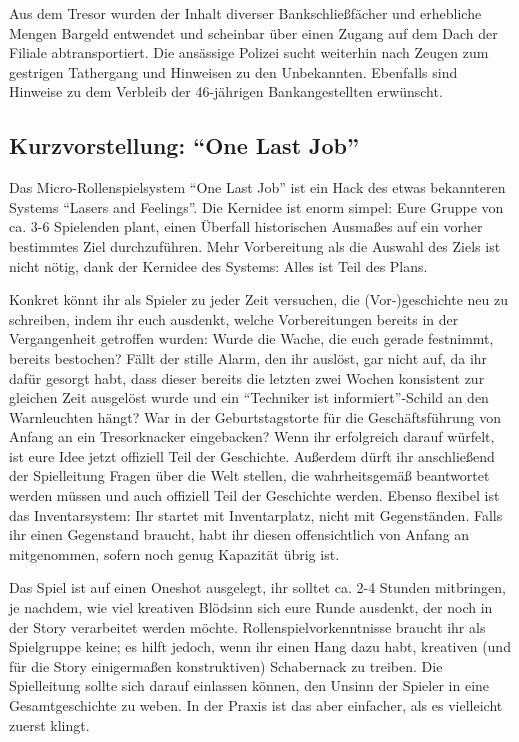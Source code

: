 \documentclass[final]{multiversum}
\begin{document}
Aus dem Tresor wurden der Inhalt diverser Bankschließfächer und erhebliche Mengen
Bargeld entwendet und scheinbar über einen Zugang auf dem Dach der Filiale
abtransportiert. Die ansässige Polizei sucht weiterhin nach Zeugen zum gestrigen
Tathergang und Hinweisen zu den Unbekannten. Ebenfalls sind Hinweise zu dem
Verbleib der 46-jährigen Bankangestellten erwünscht. 



\subsection{Kurzvorstellung: \enquote{One Last Job}}
Das Micro-Rollenspielsystem \enquote{One Last Job} ist ein Hack des etwas bekannteren
Systems \enquote{Lasers and Feelings}. Die Kernidee ist enorm simpel: Eure Gruppe von
ca. 3-6 Spielenden plant, einen Überfall historischen Ausmaßes auf ein vorher
bestimmtes Ziel durchzuführen. Mehr Vorbereitung als die Auswahl des Ziels
ist nicht nötig, dank der Kernidee des Systems: Alles ist Teil des Plans.

Konkret könnt ihr als Spieler zu jeder Zeit versuchen, die (Vor-)geschichte neu
zu schreiben, indem ihr euch ausdenkt, welche Vorbereitungen bereits in der
Vergangenheit getroffen wurden: Wurde die Wache, die euch gerade festnimmt,
bereits bestochen? Fällt der stille Alarm, den ihr auslöst, gar nicht auf, da ihr
dafür gesorgt habt, dass dieser bereits die letzten zwei Wochen konsistent zur
gleichen Zeit ausgelöst wurde und ein \enquote{Techniker ist informiert}-Schild an den
Warnleuchten hängt? War in der Geburtstagstorte für die Geschäftsführung von
Anfang an ein Tresorknacker eingebacken? Wenn ihr erfolgreich darauf würfelt,
ist eure Idee jetzt offiziell Teil der Geschichte. Außerdem dürft ihr
anschließend der Spielleitung Fragen über die Welt stellen, die wahrheitsgemäß
beantwortet werden müssen und auch offiziell Teil der Geschichte werden. Ebenso
flexibel ist das Inventarsystem: Ihr startet mit Inventarplatz, nicht mit
Gegenständen. Falls ihr einen Gegenstand braucht, habt ihr diesen offensichtlich
von Anfang an mitgenommen, sofern noch genug Kapazität übrig ist.

Das Spiel ist auf einen Oneshot ausgelegt, ihr solltet ca. 2-4 Stunden
mitbringen, je nachdem, wie viel kreativen Blödsinn sich eure Runde ausdenkt, der
noch in der Story verarbeitet werden möchte. Rollenspielvorkenntnisse braucht
ihr als Spielgruppe keine; es hilft jedoch, wenn ihr einen Hang dazu habt,
kreativen (und für die Story einigermaßen konstruktiven) Schabernack zu treiben.
Die Spielleitung sollte sich darauf einlassen können, den Unsinn der Spieler in
eine Gesamtgeschichte zu weben. In der Praxis ist das aber einfacher, als es
vielleicht zuerst klingt.
\end{document}
